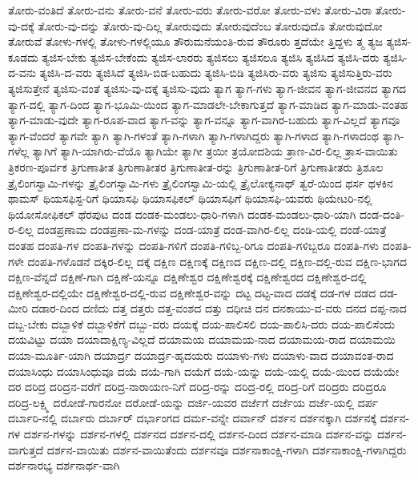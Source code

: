 {ತೋರು-ವಂತಿದೆ
ತೋರು-ವನು
ತೋರು-ವನೆ
ತೋರು-ವರು
ತೋರು-ವರೋ
ತೋರು-ವಳು
ತೋರು-ವಿರಾ
ತೋರು-ವು-ದಕ್ಕೆ
ತೋರು-ವು-ದನ್ನು
ತೋರು-ವು-ದಿಲ್ಲ
ತೋರುವುದು
ತೋರುವುದೆಂಬ
ತೋರುವುದೊ
ತೋರುವುದೋ
ತೋರುವೆ
ತೋಳು-ಗಳಲ್ಲಿ
ತೋಳು-ಗಳಲ್ಲಿಯೂ
ತೌರುಮನೆಯಂತಿ-ರುವ
ತೌರೂರು
ತ್ತದೆಯೇ
ತ್ತಿದ್ದಳು
ತ್ಮ
ತ್ಯಜ
ತ್ಯಜಿಸ-ಕೂಡದು
ತ್ಯಜಿಸ-ಬೇಕು
ತ್ಯಜಿಸ-ಬೇಕೆಂದು
ತ್ಯಜಿಸ-ಲಾರರು
ತ್ಯಜಿಸಲು
ತ್ಯಜಿಸಲೂ
ತ್ಯಜಿಸಿ
ತ್ಯಜಿಸಿದ
ತ್ಯಜಿಸಿ-ದರು
ತ್ಯಜಿಸಿ-ದ-ವನು
ತ್ಯಜಿಸಿ-ದ-ವರು
ತ್ಯಜಿಸಿದೆ
ತ್ಯಜಿಸಿ-ಬಿಡ-ಬಹುದು
ತ್ಯಜಿಸಿ-ಬಿಡಿ
ತ್ಯಜಿಸಿರು-ವರು
ತ್ಯಜಿಸು
ತ್ಯಜಿಸುತ್ತಿರು-ವರು
ತ್ಯಜಿಸುತ್ತೇನೆ
ತ್ಯಜಿಸು-ವಂತೆ
ತ್ಯಜಿಸು-ವು-ದಕ್ಕೆ
ತ್ಯಜಿಸು-ವುದು
ತ್ಯಾಗ
ತ್ಯಾಗ-ಗಳು
ತ್ಯಾಗ-ಜೀವನ
ತ್ಯಾಗ-ಜೀವನದ
ತ್ಯಾಗದ
ತ್ಯಾಗ-ದಲ್ಲಿ
ತ್ಯಾಗ-ದಿಂದ
ತ್ಯಾಗ-ಭೂಮಿ-ಯಿಂದ
ತ್ಯಾಗ-ಮಾಡಲೇ-ಬೇಕಾಗುತ್ತದೆ
ತ್ಯಾಗ-ಮಾಡಿದ
ತ್ಯಾಗ-ಮಾಡು-ವಂತಹ
ತ್ಯಾಗ-ಮಾಡು-ವುದೇ
ತ್ಯಾಗ-ರೂಪ-ವಾದ
ತ್ಯಾಗ-ವನ್ನು
ತ್ಯಾಗ-ವನ್ನೂ
ತ್ಯಾಗ-ವಾಗಿರ-ಬಹುದು
ತ್ಯಾಗ-ವಿಲ್ಲದೆ
ತ್ಯಾಗವೂ
ತ್ಯಾಗ-ವೆಂದರೆ
ತ್ಯಾಗವೇ
ತ್ಯಾಗಿ
ತ್ಯಾಗಿ-ಗಳಂತೆ
ತ್ಯಾಗಿ-ಗಳಾಗಿ
ತ್ಯಾಗಿ-ಗಳಾಗಿದ್ದರು
ತ್ಯಾಗಿ-ಗಳಾದ
ತ್ಯಾಗಿ-ಗಳಾದಂಥ
ತ್ಯಾಗಿ-ಗಳೆಲ್ಲ
ತ್ಯಾಗಿಗೆ
ತ್ಯಾಗಿ-ಯಾಗಿರು-ವೆಯೊ
ತ್ಯಾಗಿಯೇ
ತ್ಯಾಗೀ
ತ್ರಯೀ
ತ್ರಯೋದಶಿಯ
ತ್ರಾಣ-ವಿರ-ಲಿಲ್ಲ
ತ್ರಾಸ-ವಾಯಿತು
ತ್ರಿಕರಣ-ಪೂರ್ವಕ
ತ್ರಿಗುಣಾತೀತ
ತ್ರಿಗುಣಾತೀತರ
ತ್ರಿಗುಣಾತೀತ-ರನ್ನು
ತ್ರಿಗುಣಾತೀತ-ರಿಗೆ
ತ್ರಿಗುಣಾತೀತರು
ತ್ರಿಶೂಲ
ತ್ರೈಲಿಂಗಸ್ವಾಮಿ-ಗಳನ್ನು
ತ್ರೈಲಿಂಗಸ್ವಾಮಿ-ಗಳು
ತ್ರೈಲಿಂಗಸ್ವಾಮಿ-ಯಲ್ಲಿ
ತ್ರೈಲೋಕ್ಯನಾಥ್
ತ್ವರೆ-ಯಿಂದ
ಥರ್ಸ
ಥಳಕಿನ
ಥಾಮಸ್
ಥಿಯಸಫಿಸ್ಟ-ರಿಗೆ
ಥಿಯಾಸಫಿ
ಥಿಯಾಸಫಿಕಲ್
ಥಿಯಾಸಫಿಗೆ
ಥಿಯಾಸಫಿ-ಯವರು
ಥಿಯೇಟರಿ-ನಲ್ಲಿ
ಥಿಯೋಸೋಫಿಕಲ್
ಥೆರಪುಟ
ದಂಡ
ದಂಡಕ-ಮಂಡಲು-ಧಾರಿ-ಗಳಾಗಿ
ದಂಡಕ-ಮಂಡಲು-ಧಾರಿ-ಯಾಗಿ
ದಂಡ-ದಂತಿ-ರ-ಲಿಲ್ಲ
ದಂಡಪ್ರಣಾಮ
ದಂಡಪ್ರಣಾ-ಮ-ಗಳನ್ನು
ದಂಡ-ಯಾತ್ರೆ
ದಂಡ-ವಾಗಿರ-ಲಿಲ್ಲ
ದಂಡಿ-ಯಲ್ಲಿ
ದಂಡೆ-ಯಾತ್ರೆ
ದಂತಹ
ದಂಪತಿ-ಗಳ
ದಂಪತಿ-ಗಳನ್ನು
ದಂಪತಿ-ಗಳಿಗೆ
ದಂಪತಿ-ಗಳಿಬ್ಬ-ರಿಗೂ
ದಂಪತಿ-ಗಳಿಬ್ಬರೂ
ದಂಪತಿ-ಗಳು
ದಂಪತಿ-ಗಳೇ
ದಂಪತಿ-ಗಳೊಡನೆ
ದಕ್ಕಿರ-ಲಿಲ್ಲ
ದಕ್ಕೆ
ದಕ್ಷಿಣ
ದಕ್ಷಿಣಕ್ಕೆ
ದಕ್ಷಿಣದ
ದಕ್ಷಿಣ-ದಲ್ಲಿ
ದಕ್ಷಿಣ-ದಲ್ಲಿ-ರುವ
ದಕ್ಷಿಣ-ಭಾಗದ
ದಕ್ಷಿಣ-ವೆನ್ನದೆ
ದಕ್ಷಿಣೆ-ಗಾಗಿ
ದಕ್ಷಿಣೆ-ಯನ್ನೂ
ದಕ್ಷಿಣೇಶ್ವರ
ದಕ್ಷಿಣೇಶ್ವರಕ್ಕೆ
ದಕ್ಷಿಣೇಶ್ವರದ
ದಕ್ಷಿಣೇಶ್ವರ-ದಲ್ಲಿ
ದಕ್ಷಿಣೇಶ್ವರ-ದಲ್ಲಿಯೇ
ದಕ್ಷಿಣೇಶ್ವರ-ದಲ್ಲಿ-ರುವ
ದಕ್ಷಿಣೇಶ್ವರ-ವನ್ನು
ದಟ್ಟ
ದಟ್ಟ-ವಾದ
ದಡಕ್ಕೆ
ದಡ-ಗಳ
ದಡದ
ದಡ-ಮೀರಿ
ದಡಾರ-ದಿಂದ
ದಣಿದು
ದತ್ತ
ದತ್ತರು
ದತ್ತ-ವಂಶದ
ದತ್ತು
ದಧೀಚಿ
ದನ
ದನಕಾಯು-ವ-ವರು
ದನದ
ದಪ್ಪ-ನಾದ
ದಬ್ಬ-ಬೇಕು
ದಬ್ಬಾಳಿಕೆ
ದಬ್ಬಾಳಿಕೆಗೆ
ದಬ್ಬು-ವರು
ದಯಕ್ಕೆ
ದಯ-ಪಾಲಿಸಲಿ
ದಯ-ಪಾಲಿಸಿ-ದರು
ದಯ-ಪಾಲಿಸೆಂದು
ದಯವಿಟ್ಟು
ದಯಾ
ದಯಾದಾಕ್ಷಿಣ್ಯ-ವಿಲ್ಲದೆ
ದಯಾಮಯ
ದಯಾಮಯ-ನಾದ
ದಯಾಮಯ-ರಾದ
ದಯಾಮಯಿ
ದಯಾ-ಮೂರ್ತಿ-ಯಾಗಿ
ದಯಾರ್ದ್ರ
ದಯಾರ್ದ್ರ-ಹೃದಯರು
ದಯಾಳು-ಗಳು
ದಯಾಳು-ವಾದ
ದಯಾವಂತ-ರಾದ
ದಯಾಸಿಂಧು
ದಯಾಸಿಂಧುವೂ
ದಯೆ
ದಯೆ-ಗಾಗಿ
ದಯೆಗೆ
ದಯೆ-ಯನ್ನು
ದಯೆ-ಯಲ್ಲಿ
ದಯೆ-ಯಿಂದ
ದಯೆಯೇ
ದರ
ದರಿದ್ರ
ದರಿದ್ರನ-ವರೆಗೆ
ದರಿದ್ರ-ನಾರಾಯಣ-ನಿಗೆ
ದರಿದ್ರ-ರನ್ನು
ದರಿದ್ರ-ರಲ್ಲಿ
ದರಿದ್ರ-ರಿಗೆ
ದರಿದ್ರರು
ದರಿದ್ರರೂ
ದರಿದ್ರ-ಲಕ್ಷ್ಮಿ
ದರೋಡೆ-ಗಾರನೋ
ದರೋಡೆ-ಯನ್ನು
ದರ್ಜಿ-ಯವರ
ದರ್ಜೆಗೆ
ದರ್ಜೆಯ
ದರ್ಜೆ-ಯಲ್ಲಿ
ದರ್ಪ
ದರ್ಬಾರಿ-ನಲ್ಲಿ
ದರ್ಬಾರು
ದರ್ಬಾರ್
ದರ್ಭಾಂಗದ
ದರ್ಮ-ವನ್ನೇ
ದರ್ವಾನ್
ದರ್ಶನ
ದರ್ಶನಕ್ಕಾಗಿ
ದರ್ಶನಕ್ಕೆ
ದರ್ಶನ-ಗಳ
ದರ್ಶನ-ಗಳನ್ನು
ದರ್ಶನ-ಗಳಲ್ಲಿ
ದರ್ಶನದ
ದರ್ಶನ-ದಲ್ಲಿ
ದರ್ಶನ-ದಿಂದ
ದರ್ಶನ-ಮಾಡಿ
ದರ್ಶನ-ವನ್ನು
ದರ್ಶನ-ವಾಗುತ್ತದೆ
ದರ್ಶನ-ವಾಯಿತು
ದರ್ಶನ-ವಾಯಿತೆಂದು
ದರ್ಶನವೂ
ದರ್ಶನಾಕಾಂಕ್ಷಿ-ಗಳಾಗಿ
ದರ್ಶನಾಕಾಂಕ್ಷಿ-ಗಳಾಗಿದ್ದರು
ದರ್ಶನಾರಭ್ಯ
ದರ್ಶನಾರ್ಥ-ವಾಗಿ
}
